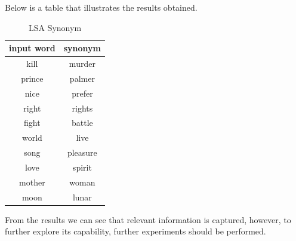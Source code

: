 \documentclass[a4paper]{book}
\newcommand{\head}[1]{\textbf{#1}}
\begin{document}
    Below is a table that illustrates the results obtained.

    \begin{table}[h]
      \centering
      \begin{tabular}{cc}
        \toprule[1.5pt]
        \head{input word}   & \head{synonym}\\
        \midrule
        kill   & murder\\
        prince   & palmer\\
        nice   & prefer\\
        right   & rights\\
        fight   & battle\\
        world   & live\\
        song   & pleasure\\
        love   & spirit\\
        mother   & woman\\
        moon   & lunar\\
        \bottomrule[1.5pt]
      \end{tabular}
      \caption{LSA Synonym\label{tab:}}
    \end{table}

    From the results we can see that relevant information is captured,
    however, to further explore its capability, further experiments
    should be performed.



\end{document}
